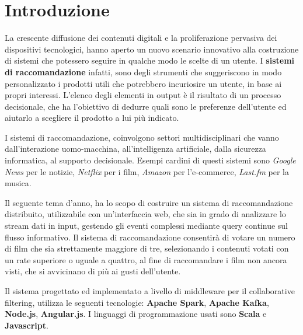 \documentclass[12pt]{article}
\begin{document}
\newpage
\section*{Introduzione}
\label{sec:intro}
La crescente diffusione dei contenuti digitali e la proliferazione pervasiva dei dispositivi tecnologici, hanno aperto un nuovo scenario innovativo alla costruzione di sistemi che potessero seguire in qualche modo le scelte di un utente. I \textbf{sistemi di raccomandazione} infatti, sono degli strumenti che suggeriscono in modo personalizzato i prodotti utili che potrebbero incuriosire un utente, in base ai propri interessi. L'elenco degli elementi in output è il risultato di un processo decisionale, che ha l'obiettivo di dedurre quali sono le preferenze dell'utente ed aiutarlo a scegliere il prodotto a lui più indicato.

I sistemi di raccomandazione, coinvolgono settori multidisciplinari che vanno dall'interazione uomo-macchina, all'intelligenza artificiale, dalla sicurezza informatica, al supporto decisionale. Esempi cardini di questi sistemi sono \textit{Google News} per le notizie, \textit{Netflix} per i film, \textit{Amazon} per l'e-commerce, \textit{Last.fm} per la musica.

Il seguente tema d'anno, ha lo scopo di costruire un sistema di raccomandazione distribuito, utilizzabile con un'interfaccia web, che sia in grado di analizzare lo stream dati in input, gestendo gli eventi complessi mediante query continue sul flusso informativo. Il sistema di raccomandazione consentirà di votare un numero di film che sia strettamente maggiore di tre, selezionando i contenuti votati con un rate superiore o uguale a quattro, al fine di raccomandare i film non ancora visti, che si avvicinano di più ai gusti dell'utente. 

Il sistema progettato ed implementato a livello di middleware per il collaborative filtering, utilizza le seguenti tecnologie: \textbf{Apache Spark}, \textbf{Apache Kafka}, \textbf{Node.js}, \textbf{Angular.js}. I linguaggi di programmazione usati sono \textbf{Scala} e \textbf{Javascript}.
\end{document}
